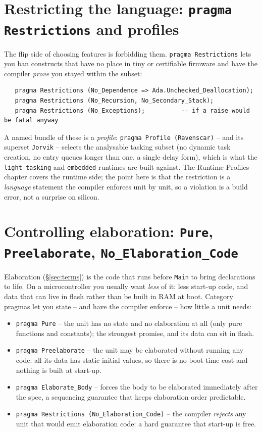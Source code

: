 \section{Restricting the language: \texttt{pragma Restrictions} and profiles}
\label{sec:restrictions}

The flip side of choosing features is forbidding them. \texttt{pragma
Restrictions} lets you ban constructs that have no place in tiny or certifiable
firmware and have the compiler \emph{prove} you stayed within the subset:

\begin{lstlisting}
   pragma Restrictions (No_Dependence => Ada.Unchecked_Deallocation);
   pragma Restrictions (No_Recursion, No_Secondary_Stack);
   pragma Restrictions (No_Exceptions);          -- if a raise would be fatal anyway
\end{lstlisting}

A named bundle of these is a \emph{profile}: \texttt{pragma Profile (Ravenscar)}
-- and its superset \texttt{Jorvik} -- selects the analysable tasking subset
(no dynamic task creation, no entry queues longer than one, a single delay form),
which is what the \texttt{light-tasking} and \texttt{embedded} runtimes are built
against. The Runtime Profiles chapter covers the runtime side; the point here is
that the restriction is a \emph{language} statement the compiler enforces unit by
unit, so a violation is a build error, not a surprise on silicon.

\section{Controlling elaboration: \texttt{Pure}, \texttt{Preelaborate}, \texttt{No\_Elaboration\_Code}}
\label{sec:elab}

Elaboration (\S\ref{sec:terms}) is the code that runs before \texttt{Main} to
bring declarations to life. On a microcontroller you usually want \emph{less} of
it: less start-up code, and data that can live in flash rather than be built in
RAM at boot. Category pragmas let you state -- and have the compiler enforce --
how little a unit needs:

\begin{itemize}
  \item \texttt{pragma Pure} -- the unit has no state and no elaboration at all
        (only pure functions and constants); the strongest promise, and its data
        can sit in flash.
  \item \texttt{pragma Preelaborate} -- the unit may be elaborated without
        running any code: all its data has static initial values, so there is no
        boot-time cost and nothing is built at start-up.
  \item \texttt{pragma Elaborate\_Body} -- forces the body to be elaborated
        immediately after the spec, a sequencing guarantee that keeps elaboration
        order predictable.
  \item \texttt{pragma Restrictions (No\_Elaboration\_Code)} -- the compiler
        \emph{rejects} any unit that would emit elaboration code: a hard guarantee
        that start-up is free.
\end{itemize}

